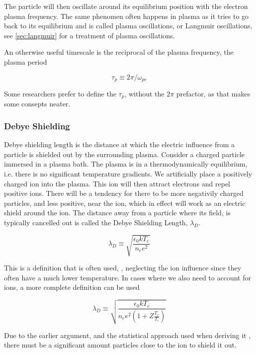 		The particle will then oscillate around its equilibrium position with
		the electron plasma frequency. The same phenomen often happens in plasma as
		it tries to go back to its equilibrium and is called plasma oscillations,
		or Langmuir oscillations, see \cref{sec:langmuir} for a treatment of plasma oscillations.

		An otherwise useful timescale is the reciprocal of the plasma frequency,
		the plasma period

		\begin{equation}
			\tau_p \equiv 2\pi/\omega_{pe}
		\end{equation}

		Some researchers prefer to define the \(\tau_p\), without the \(2\pi\) prefactor,
		as that makes some consepts neater.

		\subsubsection{Debye Shielding}
		Debye shielding length is the distance at which the electric influence
		from a particle is shielded out by the surrounding plasma.
		Consider a charged particle immersed in a plasma bath. The plasma is in
		a thermodynamically equilibrium, i.e. there is no significant temperature
		gradients. We artificially place a positively charged ion into the plasma.
		This ion will then attract electrons and repel positive ions. There will be a tendency
		for there to be more negativily charged particles, and less positive, near the
		ion, which in effect will work as an electric shield around the ion. The
		distance away from a particle where its field, is typically cancelled out is called the
		Debye Shielding Length, \(\lambda_D\).


		\begin{equation}
			\lambda_D \equiv \sqrt{\frac{\epsilon_0 kT_e}{n_e e^2}}
		\end{equation}

		This is a definition that is often used, \citep{goldston_introduction_1995},
		neglecting the ion influence since they often have a much lower temperature.
		In cases where we also need to account for ions, a more complete definition can be used

		\begin{equation}
			\lambda_D \equiv \sqrt{\frac{\epsilon_0 k T_e}{n_e e^2(1+Z \frac{T_e}{T_i})}}
		\end{equation}

		Due to the earlier argument, and the statistical approach used when deriving it \citep{goldston_introduction_1995},
		there must be a significant amount particles close to the ion to shield it out.

